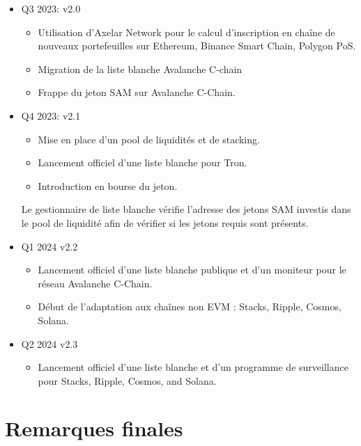 ﻿\documentclass[a4paper]{article}
\begin{document}
\begin{itemize}
\item
Q3 2023: v2.0
    \begin{itemize}
    \item Utilisation d'Axelar Network pour le calcul d’inscription en chaîne de nouveaux portefeuilles sur Ethereum, Binance Smart Chain, Polygon PoS.
    \item Migration de la liste blanche Avalanche C-chain
    \item Frappe du jeton SAM sur Avalanche C-Chain.
    \end{itemize}

\item
Q4 2023: v2.1
    \begin{itemize}
    \item Mise en place d'un pool de liquidités et de stacking. 
    \item Lancement officiel d'une liste blanche pour Tron.
    \item Introduction en bourse du jeton.
    \end{itemize}

Le gestionnaire de liste blanche vérifie l'adresse des jetons SAM investis dans le pool de liquidité afin de vérifier si les jetons requis sont présents.

\item
Q1 2024 v2.2
    \begin{itemize}
    \item Lancement officiel d'une liste blanche publique et d'un moniteur pour le réseau Avalanche C-Chain.
    \item D\'ebut de l'adaptation aux chaînes non EVM : Stacks, Ripple, Cosmos, Solana.
    \end{itemize}

\item
Q2 2024 v2.3
    \begin{itemize}
    \item Lancement officiel d'une liste blanche et d’un programme de surveillance pour Stacks, Ripple, Cosmos, and Solana.
    \end{itemize}
\end{itemize}

\newpage
\section{Remarques finales}
\end{document}
